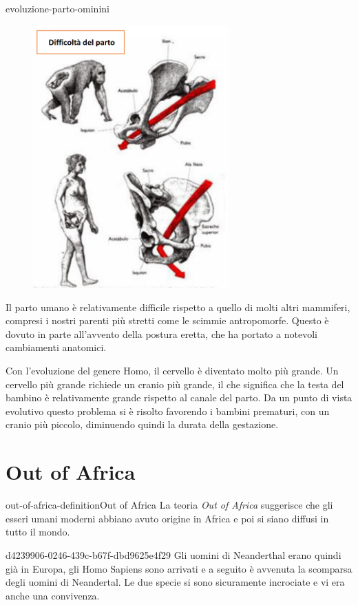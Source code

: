 \documentclass[preview]{standalone}
\begin{document}
\begin{snippet}{evoluzione-parto-ominini}
    \setlength{\intextsep}{0pt}%
    \begin{figure}
        \includegraphics[width=7.5cm]{./resources/difficolta-parto-ominini.png}
        \vspace{-1cm}
    \end{figure}

    Il parto umano è relativamente difficile rispetto a quello di molti altri mammiferi,
    compresi i nostri parenti più stretti come le scimmie antropomorfe.
    Questo è dovuto in parte all'avvento della postura eretta, che ha portato a notevoli cambiamenti
    anatomici. 

    Con l'evoluzione del genere Homo, il cervello è diventato molto più grande. Un cervello più grande richiede un cranio più grande, il che significa che la testa del bambino è relativamente grande rispetto al canale del parto.
    Da un punto di vista evolutivo questo problema si è risolto favorendo i bambini prematuri, con un cranio più piccolo,
    diminuendo quindi la durata della gestazione.
    \wrapfill
\end{snippet}

\section{Out of Africa}

\begin{snippetdefinition}{out-of-africa-definition}{Out of Africa}
    La teoria \textit{Out of Africa} suggerisce che gli esseri umani moderni abbiano avuto origine in Africa e poi si siano diffusi in tutto il mondo.
\end{snippetdefinition}


\begin{snippet}{d4239906-0246-439c-b67f-dbd9625e4f29}
    Gli uomini di Neanderthal erano quindi già in Europa, gli Homo Sapiens
    sono arrivati e a seguito è avvenuta la scomparsa degli uomini di Neandertal.
    Le due specie si sono sicuramente incrociate e vi era anche una convivenza.
\end{snippet}

\end{document}
